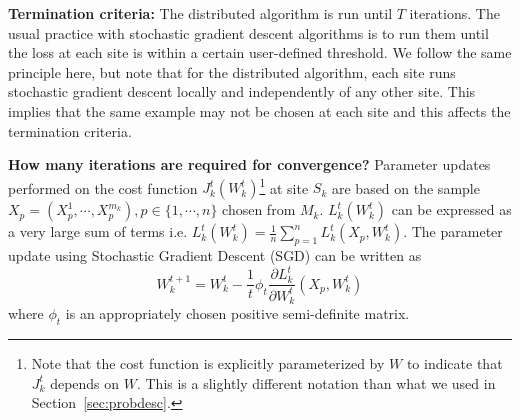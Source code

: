 % 



\noindent \textbf{Termination criteria: } The distributed algorithm is run until $T$ iterations. The usual practice with stochastic gradient descent algorithms is to run them until the loss at each site is within a certain user-defined threshold. We follow the same principle here, but note that for the distributed algorithm, each site runs stochastic gradient descent locally and independently of any other site. This implies that the same example may not be chosen at each site and this affects the termination criteria.

\noindent \textbf{How many iterations are required for convergence?} Parameter updates performed on the cost function $J_k^t(W^{t}_k)$\footnote{Note that the cost function is explicitly parameterized by $W$ to indicate that $J_k^t$ depends on $W$. This is a slightly different notation than what we                                    used in Section~\ref{sec:probdesc}.} at site $S_k$ are based on the sample $X_p =(X_p^1, \cdots, X_p^{m_k}), p \in \{1, \cdots, n\}$ chosen from $M_k$. $L_k^t(W^{t}_k)$ can be expressed as a very large sum of terms i.e. $L_k^t(W^{t}_k)=\frac{1}{n} \sum_{p=1}^{n} L^{t}_k(X_p,W^{t}_k)$. The parameter update using Stochastic Gradient Descent (SGD) can be written as
\begin{equation}
\label{localOpt1}
W^{t+1}_k = W^{t}_k - \frac{1}{t} \phi_t \frac{\partial L^{t}_k }{\partial W^{t}_k}(X_p, W^{t}_k)
\end{equation}
where $\phi_t$ is an appropriately chosen positive semi-definite matrix. 

